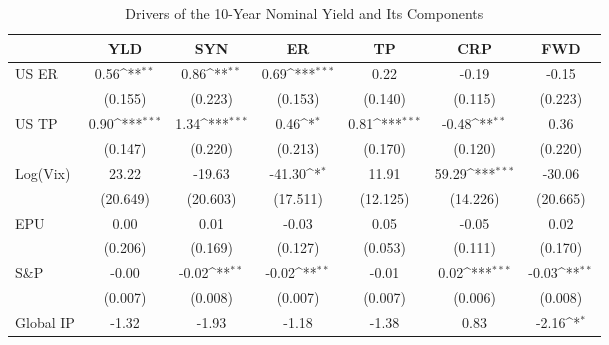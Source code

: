\begin{table}[htbp]\centering
\def\sym#1{\ifmmode^{#1}\else\(^{#1}\)\fi}
\caption{Drivers of the 10-Year Nominal Yield and Its Components}
\label{tab:ycdcmp10y}
\begin{tabular*}{0.8\hsize}{@{\hskip\tabcolsep\extracolsep\fill}l*{6}{c}}
\toprule
                    &\multicolumn{1}{c}{YLD}&\multicolumn{1}{c}{SYN}&\multicolumn{1}{c}{ER}&\multicolumn{1}{c}{TP}&\multicolumn{1}{c}{CRP}&\multicolumn{1}{c}{FWD}\\
\midrule
US ER               &        0.56\sym{**} &        0.86\sym{**} &        0.69\sym{***}&        0.22         &       -0.19         &       -0.15         \\
                    &     (0.155)         &     (0.223)         &     (0.153)         &     (0.140)         &     (0.115)         &     (0.223)         \\
\addlinespace
US TP               &        0.90\sym{***}&        1.34\sym{***}&        0.46\sym{*}  &        0.81\sym{***}&       -0.48\sym{**} &        0.36         \\
                    &     (0.147)         &     (0.220)         &     (0.213)         &     (0.170)         &     (0.120)         &     (0.220)         \\
\addlinespace
Log(Vix)            &       23.22         &      -19.63         &      -41.30\sym{*}  &       11.91         &       59.29\sym{***}&      -30.06         \\
                    &    (20.649)         &    (20.603)         &    (17.511)         &    (12.125)         &    (14.226)         &    (20.665)         \\
\addlinespace
EPU                 &        0.00         &        0.01         &       -0.03         &        0.05         &       -0.05         &        0.02         \\
                    &     (0.206)         &     (0.169)         &     (0.127)         &     (0.053)         &     (0.111)         &     (0.170)         \\
\addlinespace
S\&P                &       -0.00         &       -0.02\sym{**} &       -0.02\sym{**} &       -0.01         &        0.02\sym{***}&       -0.03\sym{**} \\
                    &     (0.007)         &     (0.008)         &     (0.007)         &     (0.007)         &     (0.006)         &     (0.008)         \\
\addlinespace
Global IP           &       -1.32         &       -1.93         &       -1.18         &       -1.38         &        0.83         &       -2.16\sym{*}  \\

\end{tabular*}
\end{table}
